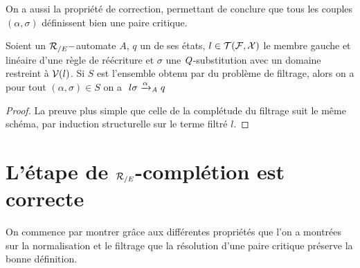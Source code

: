 On a aussi la propriété de correction, permettant de conclure que tous les couples $(\alpha,\sigma)$ définissent bien une paire critique.
\begin{property}
  \label{prop:matching-correct}
  Soient un ${\mathcal R_{/E}}-$automate $A$, $q$ un de ses états, $l \in \mathcal{T(F, X)}$ le
  membre gauche et linéaire d'une règle de réécriture et $\sigma$ une
  $\mathit Q$-substitution avec un domaine restreint à $\mathcal V(l)$.  Si $S$
  est l'ensemble obtenu par du problème de filtrage, alors on a pour
  tout $(\alpha, \sigma) \in S$ on a $\ l\sigma \xrightarrow{\alpha}_\mathit A q$
\end{property}
\begin{proof}
  La preuve plus simple que celle de la complétude du filtrage suit le même schéma, par induction structurelle 
  sur le terme filtré $l$.
\end{proof}



\section{L'étape de ${\mathcal R_{/E}}$-complétion est correcte}

On commence par montrer grâce aux différentes propriétés que l'on a montrées sur la 
normalisation et le filtrage que la résolution d'une paire critique préserve la
bonne définition.

